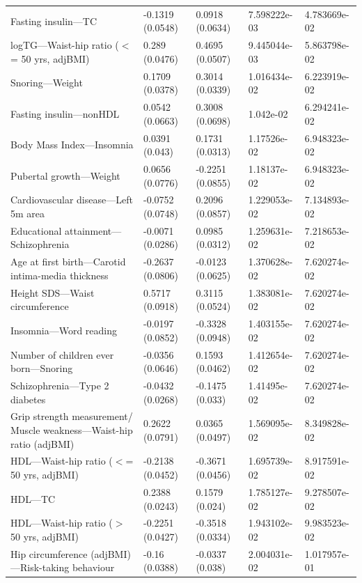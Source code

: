 \documentclass{article}\usepackage[]{graphicx}\usepackage[dvipsnames]{xcolor}
\begin{document}
\begin{longtable}{p{6cm}|p{1.5cm}|p{1.5cm}|p{1.5cm}}
  Fasting insulin---TC & -0.1319 (0.0548) & 0.0918 (0.0634) & 7.598222e-03 & 4.783669e-02 \\ 
  logTG---Waist-hip ratio ($<$= 50 yrs, adjBMI) & 0.289 (0.0476) & 0.4695 (0.0507) & 9.445044e-03 & 5.863798e-02 \\ 
  Snoring---Weight & 0.1709 (0.0378) & 0.3014 (0.0339) & 1.016434e-02 & 6.223919e-02 \\ 
  Fasting insulin---nonHDL & 0.0542 (0.0663) & 0.3008 (0.0698) & 1.042e-02 & 6.294241e-02 \\ 
  Body Mass Index---Insomnia & 0.0391 (0.043) & 0.1731 (0.0313) & 1.17526e-02 & 6.948323e-02 \\ 
  Pubertal growth---Weight & 0.0656 (0.0776) & -0.2251 (0.0855) & 1.18137e-02 & 6.948323e-02 \\ 
  Cardiovascular disease---Left 5m area & -0.0752 (0.0748) & 0.2096 (0.0857) & 1.229053e-02 & 7.134893e-02 \\ 
  Educational attainment---Schizophrenia & -0.0071 (0.0286) & 0.0985 (0.0312) & 1.259631e-02 & 7.218653e-02 \\ 
  Age at first birth---Carotid intima-media thickness & -0.2637 (0.0806) & -0.0123 (0.0625) & 1.370628e-02 & 7.620274e-02 \\ 
  Height SDS---Waist circumference & 0.5717 (0.0918) & 0.3115 (0.0524) & 1.383081e-02 & 7.620274e-02 \\ 
  Insomnia---Word reading & -0.0197 (0.0852) & -0.3328 (0.0948) & 1.403155e-02 & 7.620274e-02 \\ 
  Number of children ever born---Snoring & -0.0356 (0.0646) & 0.1593 (0.0462) & 1.412654e-02 & 7.620274e-02 \\ 
  Schizophrenia---Type 2 diabetes & -0.0432 (0.0268) & -0.1475 (0.033) & 1.41495e-02 & 7.620274e-02 \\ 
  Grip strength measurement/ Muscle weakness---Waist-hip ratio (adjBMI) & 0.2622 (0.0791) & 0.0365 (0.0497) & 1.569095e-02 & 8.349828e-02 \\ 
  HDL---Waist-hip ratio ($<$= 50 yrs, adjBMI) & -0.2138 (0.0452) & -0.3671 (0.0456) & 1.695739e-02 & 8.917591e-02 \\ 
  HDL---TC & 0.2388 (0.0243) & 0.1579 (0.024) & 1.785127e-02 & 9.278507e-02 \\ 
  HDL---Waist-hip ratio ($>$ 50 yrs, adjBMI) & -0.2251 (0.0427) & -0.3518 (0.0334) & 1.943102e-02 & 9.983523e-02 \\ 
  Hip circumference (adjBMI)---Risk-taking behaviour & -0.16 (0.0388) & -0.0337 (0.038) & 2.004031e-02 & 1.017957e-01 \\ 

\end{longtable}
\end{document}
